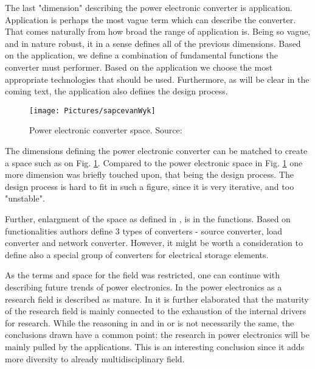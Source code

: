 \documentclass[]{scrartcl}
\begin{document}

The last "dimension" describing the power electronic converter is application. Application is perhaps the most vague term which can describe the converter. That comes naturally from how broad the range of application is. Being so vague, and in nature robust, it in a sense defines all of the previous dimensions. Based on the application, we define a combination of fundamental functions the converter must performer. Based on the application we choose the most appropriate technologies that should be used. Furthermore, as will be clear in the coming text, the application also defines the design process. 

\begin{figure}[h!]
\centering
\texttt{[image: Pictures/sapcevanWyk]}
\caption{Power electronic converter space. Source:\cite{VanWyk2014}}
\label{fig:sapcevanwyk}
\end{figure}


The dimensions defining the power electronic converter can be matched to create a space such as on Fig. \ref{fig:sapcevanwyk}. Compared to the power electronic space in Fig. \ref{fig:sapcevanwyk} one more dimension was briefly touched upon, that being the design process. The design process is hard to fit in such a figure, since it is very iterative, and too "unstable".

 Further, enlargment of the space as defined in \cite{VanWyk2013}, is in the functions. Based on functionalities authors define 3 types of converters - source converter, load converter and network converter. However, it might be worth a consideration to define also a special group of converters for electrical storage elements.
 
 

As the terms and space for the field was restricted, one can continue with describing future trends of power electronics. In \cite{Kolar2010} the power electronics as a research field is described as mature. In \cite{VanWyk2013} it is further elaborated that the maturity of the research field is mainly connected to the exhaustion of the internal drivers for research. While the reasoning in \cite{Kolar2010} and in \cite{Wyk2012} or \cite{Boroyevich2013} is not necessarily the same, the conclusions drawn have a common point: the research in power electronics will be mainly pulled by the applications. This is an interesting conclusion since it adds more diversity to already multidisciplinary field. 
\end{document}
